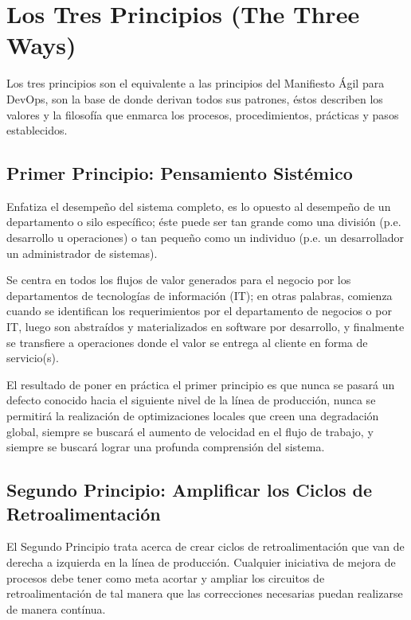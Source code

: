 \documentclass[conference]{IEEEtran}
\begin{document}
\section{Los Tres Principios (The Three Ways)}

Los tres principios son el equivalente a las principios del Manifiesto Ágil para DevOps, son la base de donde derivan todos sus patrones, éstos describen los valores y la filosofía que enmarca los procesos, procedimientos, prácticas y pasos establecidos.

\subsection{Primer Principio: Pensamiento Sistémico}

Enfatiza el desempeño del sistema completo, es lo opuesto al desempeño de un departamento o silo específico; éste puede ser tan grande como una división (p.e. desarrollo u operaciones) o tan pequeño como un individuo (p.e. un desarrollador un administrador de sistemas).

Se centra en todos los flujos de valor generados para el negocio por los departamentos de tecnologías de información (IT); en otras palabras, comienza cuando se identifican los requerimientos por el departamento de negocios o por IT, luego son abstraídos y materializados en software por desarrollo, y finalmente se transfiere a operaciones donde el valor se entrega al cliente en forma de servicio(s).

El resultado de poner en práctica el primer principio es que nunca se pasará un defecto conocido hacia el siguiente nivel de la línea de producción, nunca se permitirá la realización de optimizaciones locales que creen una degradación global, siempre se buscará el aumento de velocidad en el flujo de trabajo, y siempre se buscará lograr una profunda comprensión del sistema.

\subsection{Segundo Principio: Amplificar los Ciclos de Retroalimentación}

El Segundo Principio trata acerca de crear ciclos de retroalimentación que van de derecha a izquierda en la línea de producción. Cualquier iniciativa de mejora de procesos debe tener como meta acortar y ampliar los circuitos de retroalimentación de tal manera que las correcciones necesarias puedan realizarse de manera contínua.
\end{document}
